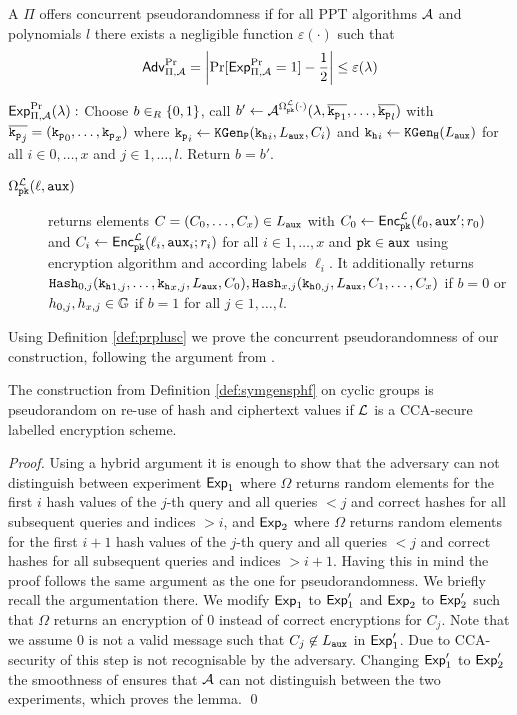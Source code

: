 \begin{definition}\label{def:prplusc}
A \SPHFF $\Pi$ offers concurrent pseudorandomness if for all PPT algorithms $\mathcal{A}$ and polynomials $l$ there exists a negligible function $\varepsilon(\cdot)$ such that
\[\mathsf{Adv}_{\Pi,\mathcal{A}}^{\Pr}=\left|\Pr[\mathsf{Exp}_{\Pi,\mathcal{A}}^{\Pr}=1] - \frac12 \right|\leq \varepsilon(\lambda)\]

\noindent
$\mathsf{Exp}_{\Pi,\mathcal{A}}^{\Pr}(\lambda):$ Choose $b\in_R\{0,1\}$, call $b'\gets\mathcal{A}^{\Omega^{\mathcal{L}}_\mathtt{pk}(\cdot)}(\lambda,\overline{\mathtt{k_p}_1},\dots,\overline{\mathtt{k_p}_l})$ with $\overline{\mathtt{k_p}_j}=(\mathtt{k_p}_0,\dots,\mathtt{k_p}_x)$ where $\mathtt{k_p}_i\gets\mathtt{KGen_P}(\mathtt{k_h}_i,L_\mathtt{aux},C_i)$ and $\mathtt{k_h}_i\gets\mathtt{KGen_H}(L_\mathtt{aux})$ for all $i\in 0,\dots,x$ and $j\in 1,\dots,l$.
Return $b=b'$.

\begin{description}
	\item[$\Omega^{\mathcal{L}}_\mathtt{pk}(\ell,\mathtt{aux})$] returns elements $C=(C_0,\dots,C_x)\in L_\mathtt{aux}$ with $C_0\gets\mathsf{Enc}^\mathcal{L}_\mathtt{pk}(\ell_0,\allowbreak\mathtt{aux}';r_0)$ and $C_i\gets\mathsf{Enc}^\mathcal{L}_\mathtt{pk}\allowbreak(\ell_i,\mathtt{aux}_i;r_i)$ for all $i\in1,\dots,x$ and $\mathtt{pk}\in\mathtt{aux}$ using encryption algorithm \cL and according labels $\ell_i$.
	It additionally returns $\mathtt{Hash}_{0,j}(\mathtt{k_h}_{1,j},\dots,\mathtt{k_h}_{x,j},L_\mathtt{aux},C_0),\mathtt{Hash}_{x,j}(\mathtt{k_h}_{0,j},\allowbreak L_\mathtt{aux},C_1,\dots,C_x)$ if $b=0$ or $h_{0,j},\allowbreak h_{x,j}\in\mathbb{G}$ if $b=1$ for all $j\in 1,\dots, l$.
\end{description}
\end{definition}

\noindent
Using Definition \ref{def:prplusc} we prove the concurrent pseudorandomness of our construction, following the argument from \cite[Lemma 1]{Katz2011}.

\begin{lemma}\label{cor:pr}
The \SPHFF construction from Definition \ref{def:symgensphf} on cyclic groups is pseudorandom on re-use of hash and ciphertext values if $\mathcal{L}$ is a CCA-secure labelled encryption scheme.
\end{lemma}

\begin{proof}
Using a hybrid argument it is enough to show that the adversary can not distinguish between experiment $\mathsf{Exp}_1$ where $\Omega$ returns random elements for the first $i$ hash values of the $j$-th query and all queries $<j$ and correct hashes for all subsequent queries and indices $>i$, and $\mathsf{Exp}_2$ where $\Omega$ returns random elements for the first $i+1$ hash values of the $j$-th query and all queries $<j$ and correct hashes for all subsequent queries and indices $>i+1$.
Having this in mind the proof follows the same argument as the one for \SPHFF pseudorandomness.
We briefly recall the argumentation there.
We modify $\mathsf{Exp}_1$ to $\mathsf{Exp}'_1$ and $\mathsf{Exp}_2$ to $\mathsf{Exp}'_2$ such that $\Omega$ returns an encryption of $0$ instead of correct encryptions for $C_j$.
Note that we assume $0$ is not a valid message such that $C_j\not\in L_\mathtt{aux}$ in $\mathsf{Exp}'_1$.
Due to CCA-security of \cL this step is not recognisable by the adversary.
Changing $\mathsf{Exp}'_1$ to $\mathsf{Exp}'_2$ the smoothness of \SPHFF ensures that $\mathcal{A}$ can not distinguish between the two experiments, which proves the lemma.
\qed
\end{proof}

